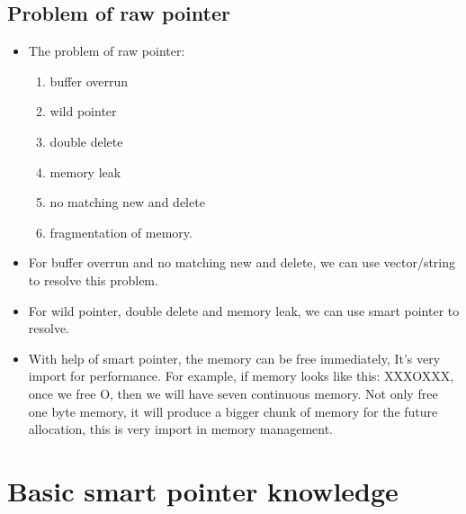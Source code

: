 \documentclass[a4paper,11pt,twoside]{book}
\begin{document}
\subsection{Problem of raw pointer}
\begin{itemize}
	\item The problem of raw pointer:
	\begin{enumerate}
		\item buffer overrun
		\item wild pointer
		\item double delete
		\item memory leak
		\item no matching new and delete
		\item fragmentation of memory.
	\end{enumerate}

	\item For buffer overrun and no matching new and delete, we can use vector/string to resolve this problem.
	
	\item For wild pointer, double delete and memory leak, we can use smart pointer to resolve. 
	
	\item With help of smart pointer, the memory can be free immediately, It's very import for performance. For example, if memory looks like this: XXXOXXX, once we free O, then we will have seven continuous memory. Not only free one byte memory, it will produce a bigger chunk of memory for the future allocation, this is very import in memory management. 
\end{itemize}



\section{Basic smart pointer knowledge}
\end{document}
